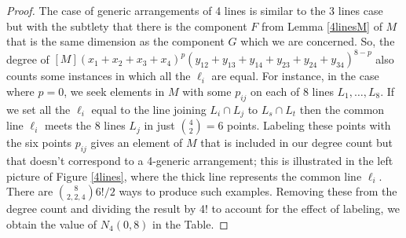 \documentclass[12pt]{article}
\theoremstyle{plain}
\theoremstyle{definition}
\begin{document}
\begin{proof}

The case of generic arrangements of 4 lines is similar to the 3 lines case but with the
subtlety that there is the component $F$ from Lemma \ref{4linesM} of $M$ that is the same dimension as the component $G$ which we are concerned. So, the degree of $[M](x_1+x_2+x_3+x_4)^p(y_{12}+y_{13}+y_{14}+y_{23}+y_{24}+y_{34})^{8-p}$
also counts some instances in which all the $\ell_i$ are equal. For
instance, in the case where $p=0$, we seek elements in $M$ with some
$p_{ij}$ on each of $8$ lines $L_1, \ldots, L_8$. If we set all the
$\ell_i$ equal to the line joining $L_i\cap L_j$ to $L_s \cap L_t$
then the common line $\ell_i$ meets the 8 lines $L_j$ in just
$\binom{4}{2}=6$ points. Labeling these points with the six points
$p_{ij}$ gives an element of $M$ that is included in our degree count
but that doesn't correspond to a 4-generic arrangement; this is
illustrated in the left picture of Figure \ref{4lines}, where the
thick line represents the common line $\ell_i$.  There are
$\binom{8}{2,2,4}6!/2$ ways to produce such examples. Removing these
from the degree count and dividing the result by 4! to account for the
effect of labeling, we obtain the value of $N_4(0,8)$ in the Table. 


\end{proof}
\end{document}
